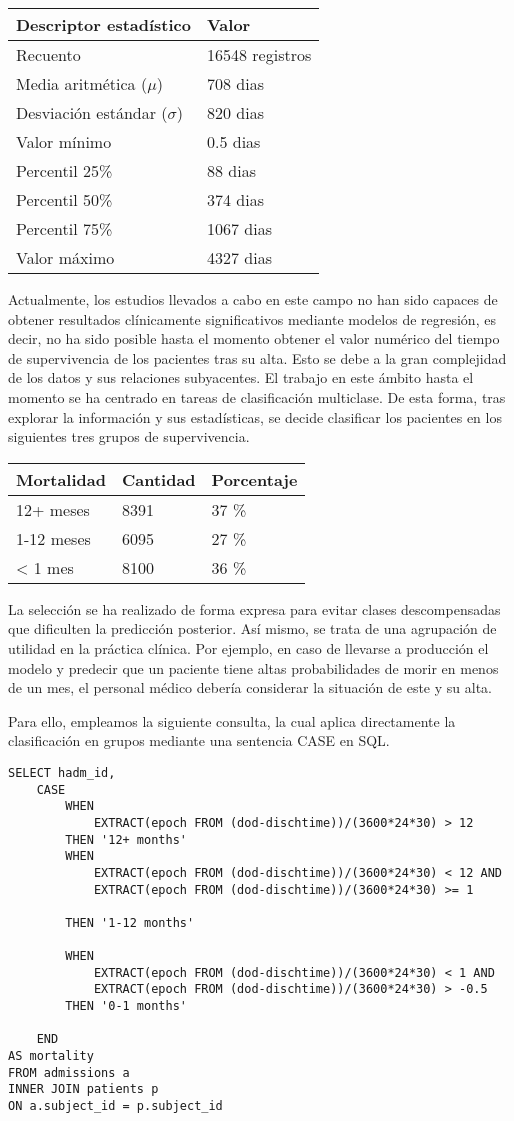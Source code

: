\documentclass{report}
\begin{document}
\begin{longtable}[]{@{}ll@{}}
\toprule
Descriptor estadístico & Valor\tabularnewline
\midrule
\endhead
Recuento & 16548 registros\tabularnewline
Media aritmética ($\mu$) & 708 dias\tabularnewline
Desviación estándar ($\sigma$) & 820 dias\tabularnewline
Valor mínimo & 0.5 dias\tabularnewline
Percentil 25\% & 88 dias\tabularnewline
Percentil 50\% & 374 dias\tabularnewline
Percentil 75\% & 1067 dias\tabularnewline
Valor máximo & 4327 dias\tabularnewline
\bottomrule
\end{longtable}

Actualmente, los estudios llevados a cabo en este campo no han sido capaces de obtener resultados clínicamente significativos mediante modelos de regresión, es decir, no ha sido posible hasta el momento obtener el valor numérico del tiempo de supervivencia de los pacientes tras su alta. Esto se debe a la gran complejidad de los datos y sus relaciones subyacentes. El trabajo en este ámbito hasta el momento se ha centrado en tareas de clasificación multiclase. De esta forma, tras explorar la información y sus estadísticas, se decide clasificar los pacientes en los siguientes tres grupos de supervivencia.

\begin{longtable}[]{@{}lll@{}}
\toprule
Mortalidad & Cantidad & Porcentaje\tabularnewline
\midrule
\endhead
12+ meses & 8391 & 37 \%\tabularnewline
1-12 meses & 6095 & 27 \%\tabularnewline
\textless{} 1 mes & 8100 & 36 \%\tabularnewline
\bottomrule
\end{longtable}

La selección se ha realizado de forma expresa para evitar clases descompensadas que dificulten la predicción posterior. Así mismo, se trata de una agrupación de utilidad en la práctica clínica. Por ejemplo, en caso de llevarse a producción el modelo y predecir que un paciente tiene altas probabilidades de morir en menos de un mes, el personal médico debería considerar la situación de este y su alta. 

Para ello, empleamos la siguiente consulta, la cual aplica directamente
la clasificación en grupos mediante una sentencia CASE en SQL.

\begin{verbatim}
SELECT hadm_id,
	CASE
		WHEN
    		EXTRACT(epoch FROM (dod-dischtime))/(3600*24*30) > 12 
    	THEN '12+ months'
    	WHEN 
    		EXTRACT(epoch FROM (dod-dischtime))/(3600*24*30) < 12 AND
     		EXTRACT(epoch FROM (dod-dischtime))/(3600*24*30) >= 1

    	THEN '1-12 months'
    									
   		WHEN
    		EXTRACT(epoch FROM (dod-dischtime))/(3600*24*30) < 1 AND
    		EXTRACT(epoch FROM (dod-dischtime))/(3600*24*30) > -0.5
    	THEN '0-1 months'	
    									
    END
AS mortality
FROM admissions a
INNER JOIN patients p
ON a.subject_id = p.subject_id
\end{verbatim}
\newpage
\end{document}
